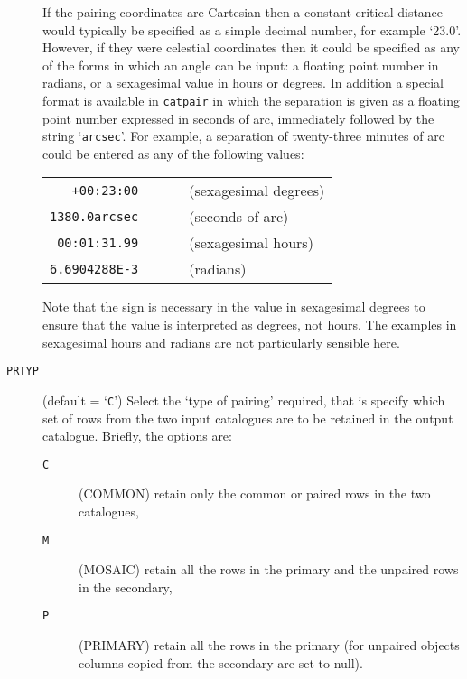 \documentclass[twoside,11pt]{starlink}
\begin{document}
\begin{description}
   If the pairing coordinates are Cartesian then a constant critical distance
   would typically be specified as a simple decimal number, for example
   `23.0'. However, if they were celestial coordinates then it could be
   specified as any of the forms in which an angle can be input: a floating
   point number in radians, or a sexagesimal value in hours or degrees. In
   addition a special format is available in \texttt{catpair} in which the
   separation is given as a floating point number expressed in seconds of
   arc, immediately followed by the string `\texttt{arcsec}'. For example, a
   separation of twenty-three minutes of arc could be entered as any of
   the following values:

  \begin{center}
  \begin{tabular}{rll}
   \texttt{+00:23:00}    & ~~~ & (sexagesimal degrees) \\
   \texttt{1380.0arcsec} & ~~~ & (seconds of arc)      \\
   \texttt{00:01:31.99}  & ~~~ & (sexagesimal hours)   \\
   \texttt{6.6904288E-3} & ~~~ & (radians)             \\
  \end{tabular}
  \end{center}

   Note that the sign is necessary in the value in sexagesimal degrees to
   ensure that the value is interpreted as degrees, not hours. The examples
   in sexagesimal hours and radians are not particularly sensible here.

  \item[ \texttt{PRTYP} ] (default = `\texttt{C}') Select the `type of
   pairing' required, that is specify which set of rows from the two input
   catalogues are to be retained in the output catalogue. Briefly, the
   options are:

  \begin{description}

    \item[\texttt{C} ] (COMMON) retain only the common or paired rows in the
     two catalogues,

    \item[\texttt{M} ] (MOSAIC) retain all the rows in the primary and the
     unpaired rows in the secondary,

    \item[\texttt{P} ] (PRIMARY) retain all the rows in the primary (for
     unpaired objects columns copied from the secondary are set to null).


\end{description}
\end{description}
\end{document}
